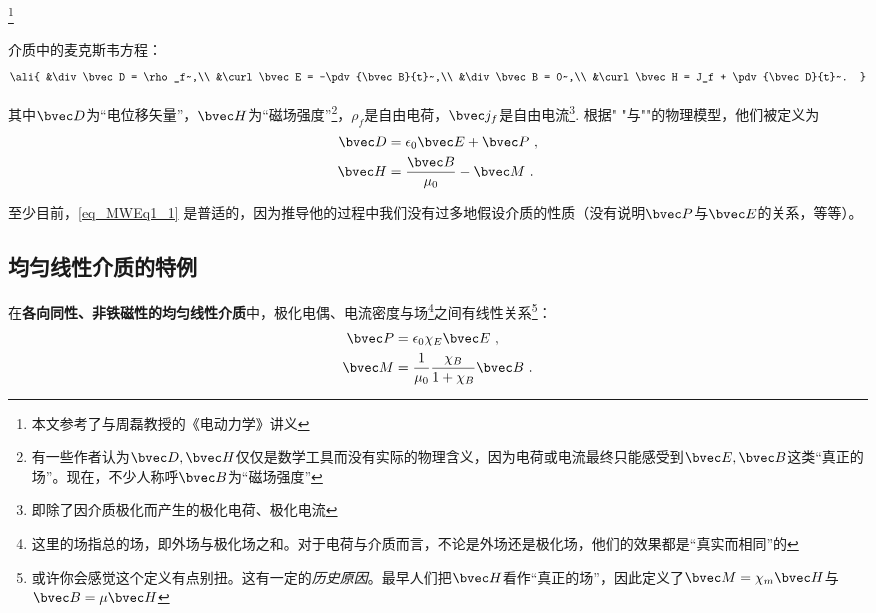 
\footnote{本文参考了\cite{GriffE}与周磊教授的《电动力学》讲义}
\begin{issues}
\issueDraft
\end{issues}

介质中的麦克斯韦方程：
\begin{equation}\label{eq_MWEq1_1}\ali{
&\div\bvec D = \rho_f~,\\
&\curl\bvec E = -\pdv{\bvec B}{t}~,\\
&\div\bvec B = 0~,\\
&\curl\bvec H = J_f + \pdv{\bvec D}{t}~.
}\end{equation}

其中$\bvec D$为“电位移矢量”，$\bvec H$为“磁场强度”\footnote{有一些作者认为$\bvec D, \bvec H$仅仅是数学工具而没有实际的物理含义，因为电荷或电流最终只能感受到$\bvec E, \bvec B$这类“真正的场”。现在，不少人称呼$\bvec B$为“磁场强度”}，$\rho_f$是自由电荷，$\bvec j_f$是自由电流\footnote{即除了因介质极化而产生的极化电荷、极化电流}. 根据" "与""的物理模型，他们被定义为
\begin{align}
\bvec D &= \epsilon_0 \bvec E + \bvec P~,\\
\bvec H &= \frac{\bvec B}{\mu_0} - \bvec M~.\\
\end{align}

至少目前，\autoref{eq_MWEq1_1} 是普适的，因为推导他的过程中我们没有过多地假设介质的性质（没有说明$\bvec P$与$\bvec E$的关系，等等）。

\subsection{均匀线性介质的特例}
在\textbf{各向同性、非铁磁性的均匀线性介质}中，极化电偶、电流密度与场\footnote{这里的场指总的场，即外场与极化场之和。对于电荷与介质而言，不论是外场还是极化场，他们的效果都是“真实而相同”的}之间有线性关系\footnote{或许你会感觉这个定义有点别扭。这有一定的\textsl{历史原因}。最早人们把$\bvec H$看作“真正的场”，因此定义了$\bvec M = \chi_m \bvec H$与$\bvec B = \mu \bvec H$}：
\begin{align}
\bvec P &= \epsilon_0 \chi_E \bvec E~,\\
\bvec M &= \frac{1}{\mu_0} \frac{\chi_B}{1+\chi_B}\bvec B~.\\
\end{align}


